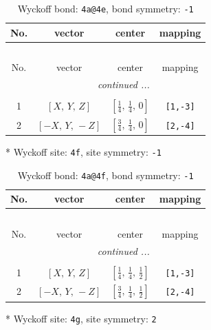 \documentclass[fleqn,8pt]{jsarticle}
\begin{document}
\begin{longtable}{cccc}
\caption{Wyckoff bond: {\tt 4a@4e}, bond symmetry: {\tt -1}}
 \\
 \hline \hline
No. & vector & center & mapping \\ \hline \endfirsthead

\multicolumn{3}{l}{\tablename\ \thetable{}} \\
 \hline \hline
No. & vector & center & mapping \\ \hline \endhead

 \hline \hline
\multicolumn{3}{r}{\footnotesize\it continued ...} \\ \endfoot

 \hline \hline
\multicolumn{3}{r}{} \\ \endlastfoot

1 & $\left[ X,\, Y,\, Z \right]$ & $\left[ \frac{1}{4},\, \frac{1}{4},\, 0 \right]$ & {\tt [1,-3]} \\ \hline
2 & $\left[ - X,\, Y,\, - Z \right]$ & $\left[ \frac{3}{4},\, \frac{1}{4},\, 0 \right]$ & {\tt [2,-4]} \\
\end{longtable}
* Wyckoff site: {\tt 4f}, site symmetry: {\tt -1}
\renewcommand{\arraystretch}{1.2}
\begin{longtable}{cccc}
\caption{Wyckoff bond: {\tt 4a@4f}, bond symmetry: {\tt -1}}
 \\
 \hline \hline
No. & vector & center & mapping \\ \hline \endfirsthead

\multicolumn{3}{l}{\tablename\ \thetable{}} \\
 \hline \hline
No. & vector & center & mapping \\ \hline \endhead

 \hline \hline
\multicolumn{3}{r}{\footnotesize\it continued ...} \\ \endfoot

 \hline \hline
\multicolumn{3}{r}{} \\ \endlastfoot

1 & $\left[ X,\, Y,\, Z \right]$ & $\left[ \frac{1}{4},\, \frac{1}{4},\, \frac{1}{2} \right]$ & {\tt [1,-3]} \\ \hline
2 & $\left[ - X,\, Y,\, - Z \right]$ & $\left[ \frac{3}{4},\, \frac{1}{4},\, \frac{1}{2} \right]$ & {\tt [2,-4]} \\
\end{longtable}
* Wyckoff site: {\tt 4g}, site symmetry: {\tt 2}
\renewcommand{\arraystretch}{1.2}
\end{document}
